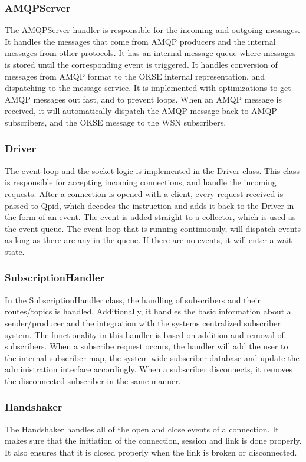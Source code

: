 \subsubsection{AMQPServer}
The AMQPServer handler is responsible for the incoming and outgoing messages. It handles the messages that come from AMQP producers and the internal messages from other protocols. It has an internal message queue where messages is stored until the corresponding event is triggered. It handles conversion of messages from AMQP format to the OKSE internal representation, and dispatching to the message service. It is implemented with optimizations to get AMQP messages out fast, and to prevent loops. When an AMQP message is received, it will automatically dispatch the AMQP message back to AMQP subscribers, and the OKSE message to the WSN subscribers.

\subsubsection{Driver}
The event loop and the socket logic is implemented in the Driver class. This class is responsible for accepting incoming connections, and handle the incoming requests. After a connection is opened with a client, every request received is passed to Qpid, which decodes the instruction and adds it back to the Driver in the form of an event. The event is added straight to a collector, which is used as the event queue. The event loop that is running continuously, will dispatch events as long as there are any in the queue. If there are no events, it will enter a wait state.

\subsubsection{SubscriptionHandler}
In the SubscriptionHandler class, the handling of subscribers and their routes/topics is handled. Additionally, it handles the basic information about a sender/producer and the integration with the systems centralized subscriber system. The functionality in this handler is based on addition and removal of subscribers. When a subscribe request occurs, the handler will add the user to the internal subscriber map, the system wide subscriber database and update the administration interface accordingly. When a subscriber disconnects, it removes the disconnected subscriber in the same manner.

\subsubsection{Handshaker}
The Handshaker handles all of the open and close events of a connection. It makes sure that the initiation of the connection, session and link is done properly. It also ensures that it is closed properly when the link is broken or disconnected.

